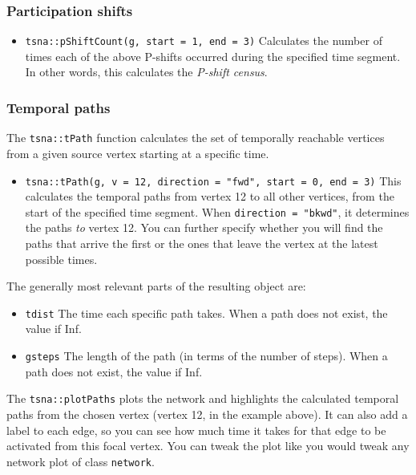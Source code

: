 \documentclass[
]{article}
\providecommand{\tightlist}{%
  \setlength{\itemsep}{0pt}\setlength{\parskip}{0pt}}
\begin{document}
\hypertarget{participation-shifts}{%
\subsubsection{Participation shifts}\label{participation-shifts}}

\begin{itemize}
\tightlist
\item
  \texttt{tsna::pShiftCount(g,\ start\ =\ 1,\ end\ =\ 3)} Calculates the
  number of times each of the above P-shifts occurred during the
  specified time segment. In other words, this calculates the
  \emph{P-shift census}.
\end{itemize}

\hypertarget{temporal-paths}{%
\subsubsection{Temporal paths}\label{temporal-paths}}

The \texttt{tsna::tPath} function calculates the set of temporally
reachable vertices from a given source vertex starting at a specific
time.

\begin{itemize}
\tightlist
\item
  \texttt{tsna::tPath(g,\ v\ =\ 12,\ direction\ =\ "fwd",\ start\ =\ 0,\ end\ =\ 3)}
  This calculates the temporal paths from vertex 12 to all other
  vertices, from the start of the specified time segment. When
  \texttt{direction\ =\ "bkwd"}, it determines the paths \emph{to}
  vertex 12. You can further specify whether you will find the paths
  that arrive the first or the ones that leave the vertex at the latest
  possible times.
\end{itemize}

The generally most relevant parts of the resulting object are:

\begin{itemize}
\item
  \texttt{tdist} The time each specific path takes. When a path does not
  exist, the value if Inf.
\item
  \texttt{gsteps} The length of the path (in terms of the number of
  steps). When a path does not exist, the value if Inf.
\end{itemize}

The \texttt{tsna::plotPaths} plots the network and highlights the
calculated temporal paths from the chosen vertex (vertex 12, in the
example above). It can also add a label to each edge, so you can see how
much time it takes for that edge to be activated from this focal vertex.
You can tweak the plot like you would tweak any network plot of class
\texttt{network}.
\end{document}

